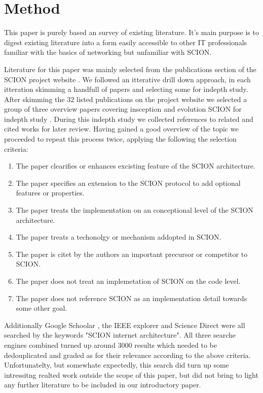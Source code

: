 \documentclass[../eva1_scion.tex]{subfiles}
\begin{document}
    \section{Method}\label{sec:method}

   This paper is purely based an survey of existing literature. It's main purpose is to digest existing literature into a form easily accessible to other IT professionals familiar with the basics of networking but unfamiliar with SCION.

   Literature for this paper was mainly selected from the publications section of the SCION project website \cite{scion_website}. We followed an itterative drill down approach, in each itteration skimming a handfull of papers and selecting some for indepth study. After skimming the 32 listed publications on the project website we selected a group of three overview papers covering insception and evolution SCION for indepth study \cite{scion_2011, scion_2015, scion_2017}. During this indepth study we collected references to related and cited works for later review. Having gained a good overview of the topic we proceeded to repeat this process twice, applying the following the selection criteria:

   \begin{enumerate}
       \item The paper clearifies or enhances excisting feature of the SCION architecture.
       \item The paper specifies an extension to the SCION protocol to add optional features or properties.
       \item The paper treats the implementation on an conceptional level of the SCION architecture.
       \item The paper treats a techonolgy or mechanism addopted in SCION.
       \item The paper is citet by the authors an important precursor or competitor to SCION.
       \item The paper does not treat an implemetation of SCION on the code level.
       \item The paper does not reference SCION as an implementation detail towards some other goal.
   \end{enumerate}

   Additionally Google Schoolar \cite{google_scholar}, the IEEE explorer \cite{i3e_explorer} and Science Direct \cite{science_direct} were all searched by the keywords "SCION internet architecture". All three searche engines combined turned up around 3000 results which needed to be dedouplicated and graded as for their relevance according to the above criteria. Unfortunatelty, but somewhate expectedly, this search did turn up some intressitng realted work outside the scope of this paper, but did not bring to light any further literature to be included in our introductory paper.
\end{document}

